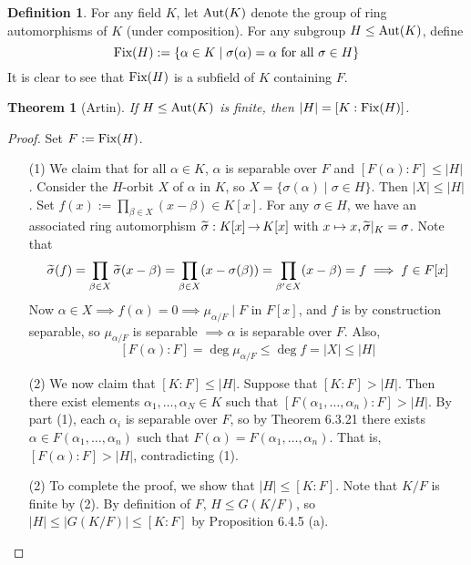 \documentclass[11pt]{book}
\newcounter{counter}
\newtheorem{theorem}[counter]{Theorem}   \newtheorem*{theorem*}{Theorem}   \newtheorem{lemma}[counter]{Lemma}   \newtheorem{corollary}[counter]{Corollary}
\theoremstyle{definition}   \newtheorem{defn}[counter]{Definition} %
\DeclareMathOperator{\ra}{\rightarrow}   \DeclareMathOperator{\Poly}{\mathbf{P}}   \DeclareMathOperator{\spn}{\textnormal{span}}   \DeclareMathOperator{\aut}{\textnormal{Aut}}
\newcommand{\vs}{\vspace{8pt}}   \newcommand{\hs}{\hspace{8pt}}
\numberwithin{counter}{chapter}
\begin{document}
\vs

\begin{defn}
For any field $K$, let $\aut(K)$ denote the group of ring automorphisms of $K$ (under composition). For any subgroup $H \leq \aut(K)$, define
	\[\textnormal{Fix}(H) := \{\alpha \in K \mid \sigma(\alpha) = \alpha \textnormal{ for all } \sigma \in H \} \]
It is clear to see that $\textnormal{Fix}(H)$ is a subfield of $K$ containing $F$. 
\end{defn}

\vs

\begin{theorem}[Artin]
If $H \leq \aut(K)$ is finite, then $|H| = [K : \textnormal{Fix}(H)]$. 
\end{theorem}

\begin{proof}
Set $F := \textnormal{Fix}(H)$. 
\begin{enumerate}
\item[(1)] We claim that for all $\alpha \in K$, $\alpha$ is separable over $F$ and $[F(\alpha) : F] \leq |H|$. Consider the $H$-orbit $X$ of $\alpha$ in $K$, so $X = \{\sigma(\alpha) \mid \sigma \in H\}$. Then $|X| \leq |H|$. Set $f(x) := \prod_{\beta \in X} (x-\beta) \in K[x]$. For any $\sigma \in H$, we have an associated ring automorphism $\wt{\sigma} : K[x] \ra K[x]$ with $x \mapsto x, \widetilde{\sigma}|_K = \sigma$. Note that 
	\[\widetilde{\sigma}(f) = \prod_{\beta \in X} \widetilde{\sigma}(x-\beta) = \prod_{\beta \in X} (x-\sigma(\beta)) = \prod_{\beta' \in X} (x-\beta) = f \implies f \in F[x] \]
Now $\alpha \in X \implies f(\alpha) = 0 \implies \mu_{\alpha/F} \mid F$ in $F[x]$, and $f$ is by construction separable, so $\mu_{\alpha/F}$ is separable $\implies \alpha$ is separable over $F$. Also,
	\[[F(\alpha) : F] = \deg\mu_{\alpha/F} \leq \deg f = |X| \leq |H| \]

\item[(2)] We now claim that $[K : F] \leq |H|$. Suppose that $[K : F] > |H|$. Then there exist elements $\alpha_1,\dots,\alpha_N \in K$ such that $[F(\alpha_1,\dots,\alpha_n) : F] > |H|$. By part (1), each $\alpha_i$ is separable over $F$, so by Theorem 6.3.21 there exists $\alpha \in F(\alpha_1,\dots,\alpha_n)$ such that $F(\alpha) = F(\alpha_1,\dots,\alpha_n)$. That is, $[F(\alpha) : F] > |H|$, contradicting (1). 
\item[(2)] To complete the proof, we show that $|H| \leq [K : F]$. Note that $K/F$ is finite by (2). By definition of $F$, $H \leq G(K/F)$, so $|H| \leq |G(K/F)| \leq [K : F]$ by Proposition 6.4.5 (a).
\end{enumerate}
\end{proof}
\end{document}
